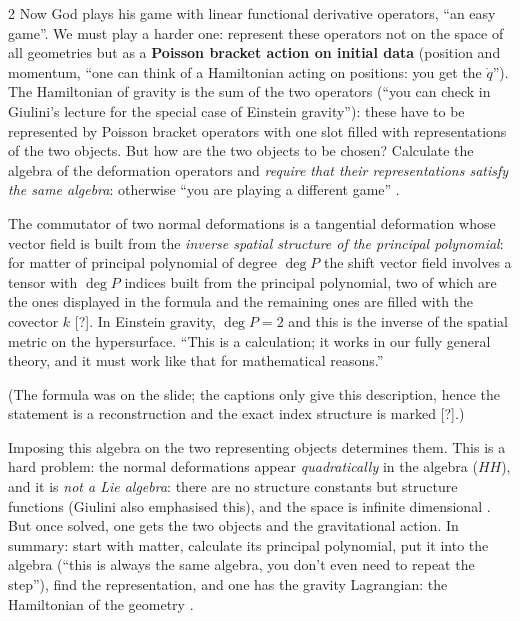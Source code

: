 \begin{paracol}{2}
Now God plays his game with linear functional derivative operators, ``an easy game''. We must play a harder one: represent these operators not on the space of all geometries but as a \textbf{Poisson bracket action on initial data} (position and momentum, ``one can think of a Hamiltonian acting on positions: you get the $\dot q$''). The Hamiltonian of gravity is the sum of the two operators (``you can check in Giulini's lecture for the special case of Einstein gravity''): these have to be represented by Poisson bracket operators with one slot filled with representations of the two objects. But how are the two objects to be chosen? Calculate the algebra of the deformation operators and \emph{require that their representations satisfy the same algebra}: otherwise ``you are playing a different game'' .

\begin{theorem}\label{thm:c26-algebra}
The commutator of two normal deformations is a tangential deformation whose vector field is built from the \emph{inverse spatial structure of the principal polynomial}: for matter of principal polynomial of degree $\deg P$ the shift vector field involves a tensor with $\deg P$ indices built from the principal polynomial, two of which are the ones displayed in the formula and the remaining ones are filled with the covector $k$ [?]. In Einstein gravity, $\deg P=2$ and this is the inverse of the spatial metric on the hypersurface. ``This is a calculation; it works in our fully general theory, and it must work like that for mathematical reasons.''
\end{theorem}
(The formula was on the slide; the captions only give this description, hence the statement is a reconstruction and the exact index structure is marked [?].)

Imposing this algebra on the two representing objects determines them. This is a hard problem: the normal deformations appear \emph{quadratically} in the algebra ($HH$), and it is \emph{not a Lie algebra}: there are no structure constants but structure functions (Giulini also emphasised this), and the space is infinite dimensional . But once solved, one gets the two objects and the gravitational action. In summary: start with matter, calculate its principal polynomial, put it into the algebra (``this is always the same algebra, you don't even need to repeat the step''), find the representation, and one has the gravity Lagrangian: the Hamiltonian of the geometry .


\end{paracol}
